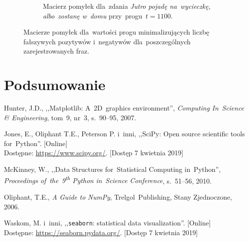 \documentclass[11pt,a4paper]{article}
\begin{document}
\begin{figure}
\begin{subfigure}[t]{0.45\textwidth}
        \caption{Macierz pomyłek dla~zdania \emph{Jutro pojadę na~wycieczkę, albo~zostanę w~domu} przy~progu~$t = 1100$.}
    \end{subfigure}
    \caption{Macierze pomyłek dla~wartości progu minimalizujących liczbę fałszywych pozytywów i~negatywów dla~poszczególnych zarejestrowanych fraz.}
\end{figure}

\section{Podsumowanie}

\begin{thebibliography}{9}

        Hunter, J.D.,
        ,,Matplotlib: A~2D~graphics environment'',
        \emph{Computing In~Science \& Engineering},
        tom~9,
        nr~3,
        s.~90--95,
        2007.

        Jones, E., Oliphant T.E., Peterson P. i~inni,
        ,,SciPy: Open source scientific tools for~Python''.
        [Online]
        \\
        Dostępne: \url{https://www.scipy.org/}.
        [Dostęp 7 kwietnia 2019]

        McKinney, W.,
        ,,Data Structures for~Statistical Computing in~Python'',
        \emph{Proceedings of~the~9\textsuperscript{th} Python in~Science Conference},
        s.~51--56,
        2010.

        Oliphant, T.E.,
        \emph{A Guide to NumPy},
        Trelgol~Publishing,
        Stany Zjednoczone,
        2006.

        Waskom, M. i~inni,
        ,,\texttt{seaborn}: statistical data visualization''.
        [Online]
        \\
        Dostępne: \url{https://seaborn.pydata.org/}.
        [Dostęp 7 kwietnia 2019]


\end{thebibliography}
\end{document}

